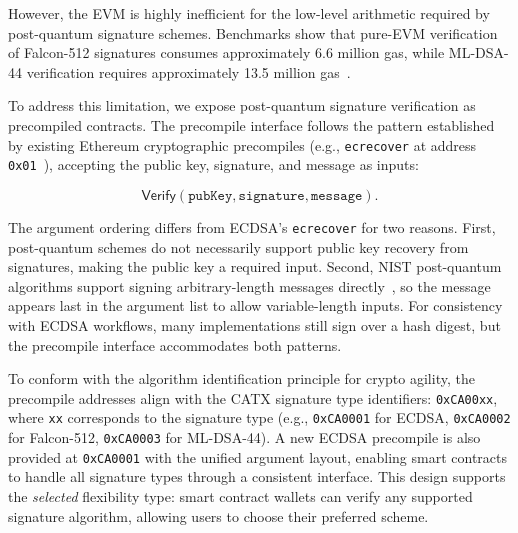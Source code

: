 However, the EVM is highly inefficient for the low-level arithmetic required by post-quantum signature schemes.
Benchmarks show that pure-EVM verification of Falcon-512 signatures consumes approximately 6.6 million gas, while ML-DSA-44 verification requires approximately 13.5 million gas~\cite{ethdilithium_repo,ethfalcon_repo}.

To address this limitation, we expose post-quantum signature verification as precompiled contracts.
The precompile interface follows the pattern established by existing Ethereum cryptographic precompiles (e.g., \texttt{ecrecover} at address \texttt{0x01}~\cite{ETH:W14}), accepting the public key, signature, and message as inputs:

\begin{equation}\label{eq:precompile-interface}
\mathsf{Verify}(\texttt{pubKey}, \texttt{signature}, \texttt{message}).
\end{equation}

The argument ordering differs from ECDSA's \texttt{ecrecover} for two reasons.
First, post-quantum schemes do not necessarily support public key recovery from signatures, making the public key a required input.
Second, NIST post-quantum algorithms support signing arbitrary-length messages directly~\cite{NIST:24MLDSA}, so the message appears last in the argument list to allow variable-length inputs.
For consistency with ECDSA workflows, many implementations still sign over a hash digest, but the precompile interface accommodates both patterns.

To conform with the algorithm identification principle for crypto agility, the precompile addresses align with the CATX signature type identifiers: \texttt{0xCA00xx}, where \texttt{xx} corresponds to the signature type (e.g., \texttt{0xCA0001} for ECDSA, \texttt{0xCA0002} for Falcon-512, \texttt{0xCA0003} for ML-DSA-44).
A new ECDSA precompile is also provided at \texttt{0xCA0001} with the unified argument layout, enabling smart contracts to handle all signature types through a consistent interface.
This design supports the \emph{selected} flexibility type: smart contract wallets can verify any supported signature algorithm, allowing users to choose their preferred scheme.%


